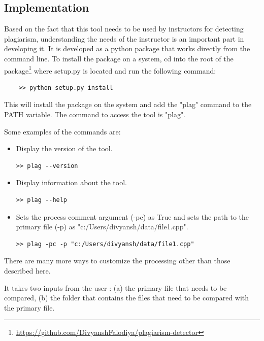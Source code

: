 \documentclass[12pt]{article}
\begin{document}
\subsection{Implementation}
Based on the fact that this tool needs to be used by instructors for detecting plagiarism, understanding the needs of the instructor is an important part in developing it. It is developed as a python package that works directly from the command line. To install the package on a system, cd into the root of the package\footnote{\url{https://github.com/DivyanshFalodiya/plagiarism-detector}} where setup.py is located and run the following command:
\begin{verbatim}
    >> python setup.py install
\end{verbatim}
This will install the package on the system and add the "plag" command to the PATH variable.
The command to access the tool is "plag".\par
Some examples of the commands are:
\begin{itemize}
    \item Display the version of the tool.
    \begin{lstlisting}[style=DOS]
    >> plag --version
    \end{lstlisting}
    
    \item Display information about the tool.
    \begin{lstlisting}[style=DOS]
    >> plag --help
    \end{lstlisting}
    
    \item Sets the process comment argument (-pc) as True and sets the path to the primary file (-p) as "c:/Users/divyansh/data/file1.cpp".
    \begin{lstlisting}[style=DOS]
    >> plag -pc -p "c:/Users/divyansh/data/file1.cpp"
    \end{lstlisting}
\end{itemize}
There are many more ways to customize the processing other than those described here. \par
It takes two inputs from the user : (a) the primary file that needs to be compared, (b) the folder that contains the files that need to be compared with the primary file. \par
\end{document}
